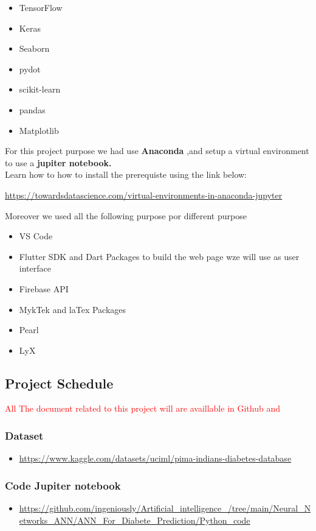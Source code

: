\documentclass[rnd]{mas_proposal}
\begin{document}
\begin{itemize}
    \item TensorFlow
    \item Keras
    \item Seaborn
    \item pydot
    \item scikit-learn
    \item pandas
    \item Matplotlib
\end{itemize}

For this project purpose we had use 
\textbf{Anaconda },and setup a virtual environment to use a \textbf{jupiter notebook.}
\\
Learn how to how to install the prerequiste using the link below:

\url{https://towardsdatascience.com/virtual-environments-in-anaconda-jupyter}

Moreover we used all the following purpose por different purpose


\begin{itemize}
    \item VS Code
    \item Flutter SDK and Dart Packages to build the web page wze will use as user interface 
    \item  Firebase API
    \item MykTek and laTex Packages
    \item Pearl
    \item LyX
\end{itemize}

\subsection{Project Schedule}
\textcolor{red}{All The document related to this project will are availlable in Github and 
}
\subsubsection*{Dataset}
\begin{itemize}
    \item \url{https://www.kaggle.com/datasets/uciml/pima-indians-diabetes-database}
\end{itemize}

\subsubsection*{Code Jupiter notebook}
\begin{itemize}
    \item \url{https://github.com/ingeniously/Artificial_intelligence_/tree/main/Neural_Networks_ANN/ANN_For_Diabete_Prediction/Python_code}
\end{itemize}
\end{document}
